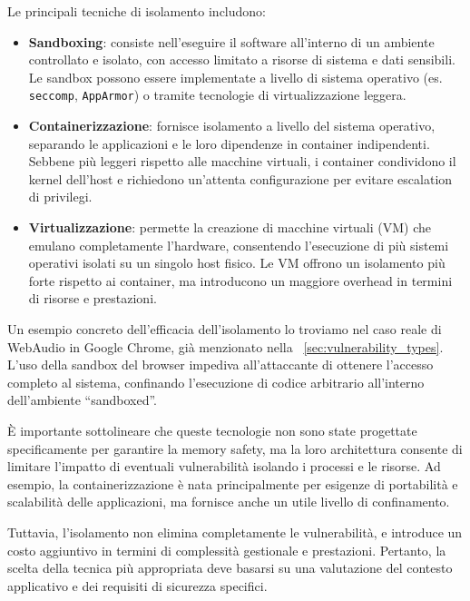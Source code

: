 Le principali tecniche di isolamento includono:
\begin{itemize}
  \item \textbf{Sandboxing}: consiste nell'eseguire il software all'interno di un
    ambiente controllato e isolato, con accesso limitato a risorse di sistema e
    dati sensibili. Le sandbox possono essere implementate a livello di sistema operativo
    (es. \texttt{seccomp}, \texttt{AppArmor}) o tramite tecnologie di virtualizzazione
    leggera.

  \item \textbf{Containerizzazione}: fornisce isolamento a livello del sistema operativo,
    separando le applicazioni e le loro dipendenze in container indipendenti. Sebbene
    più leggeri rispetto alle macchine virtuali, i container condividono il
    kernel dell'host e richiedono un'attenta configurazione per evitare
    escalation di privilegi.

  \item \textbf{Virtualizzazione}: permette la creazione di macchine virtuali (VM)
    che emulano completamente l'hardware, consentendo l'esecuzione di più
    sistemi operativi isolati su un singolo host fisico. Le VM offrono un isolamento
    più forte rispetto ai container, ma introducono un maggiore overhead in
    termini di risorse e prestazioni.
\end{itemize}

Un esempio concreto dell'efficacia dell'isolamento lo troviamo nel caso reale di
WebAudio in Google Chrome, già menzionato nella ~\autoref{sec:vulnerability_types}.
L'uso della sandbox del browser impediva all'attaccante di ottenere l'accesso
completo al sistema, confinando l'esecuzione di codice arbitrario all'interno dell'ambiente
``sandboxed''.~\cite{webaudio_uaf}

È importante sottolineare che queste tecnologie non sono state progettate specificamente
per garantire la memory safety, ma la loro architettura consente di limitare l'impatto
di eventuali vulnerabilità isolando i processi e le risorse. Ad esempio, la
containerizzazione è nata principalmente per esigenze di portabilità e
scalabilità delle applicazioni, ma fornisce anche un utile livello di confinamento.

Tuttavia, l'isolamento non elimina completamente le vulnerabilità, e introduce un
costo aggiuntivo in termini di complessità gestionale e prestazioni. Pertanto, la
scelta della tecnica più appropriata deve basarsi su una valutazione del contesto
applicativo e dei requisiti di sicurezza specifici.